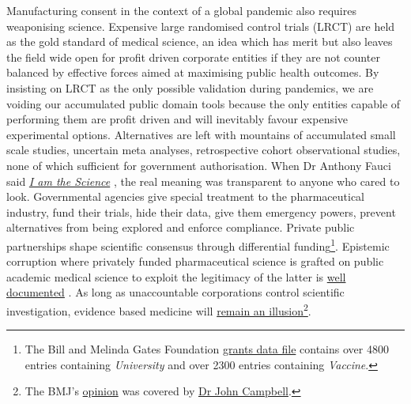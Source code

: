 \documentclass[11pt,a4paper,notitlepage]{report}
\begin{document}
Manufacturing consent in the context of a global pandemic also requires weaponising science. Expensive large randomised control trials (LRCT) are held as the gold standard of medical science, an idea which has merit but also leaves the field wide open for profit driven corporate entities if they are not counter balanced by effective forces aimed at maximising public health outcomes. By insisting on LRCT as the only possible validation during pandemics, we are voiding our accumulated public domain tools because the only entities capable of performing them are profit driven and will inevitably favour expensive experimental options. Alternatives are left with mountains of accumulated small scale studies, uncertain meta analyses, retrospective cohort observational studies, none of which sufficient for government authorisation. When Dr Anthony Fauci said \href{https://www.nationalreview.com/2021/11/anthony-fauci-i-am-the-science/}{\textit{I am the Science}} \cite{nationalreview29112021}, the real meaning was transparent to anyone who cared to look. Governmental agencies give special treatment to the pharmaceutical industry, fund their trials, hide their data, give them emergency powers, prevent alternatives from being explored and enforce compliance. Private public partnerships shape scientific consensus through differential funding\footnote{The Bill and Melinda Gates Foundation \href{https://reporter.nih.gov/search/-bvPCvB7zkyvb1AjAgW5Yg/project-details/8674931}{grants data file} \cite{bmgf-grants} contains over 4800 entries containing \textit{University} and over 2300 entries containing \textit{Vaccine}.}. Epistemic corruption where privately funded pharmaceutical science is grafted on public academic medical science to exploit the legitimacy of the latter is \href{https://www.ncbi.nlm.nih.gov/pmc/articles/PMC8028448/}{well documented} \cite{Sismondo2021-xe}. As long as unaccountable corporations control scientific investigation, evidence based medicine will \href{https://www.bmj.com/content/376/bmj.o702}{remain an illusion}\footnote{The BMJ's \href{https://www.bmj.com/content/376/bmj.o702}{opinion} \cite{bmj16032022} was covered by \href{https://www.youtube.com/watch?v=vZlZIXHT0yA&t=1128s}{Dr John Campbell}.}.
\end{document}
